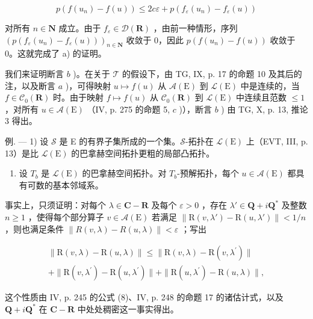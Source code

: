 \[
p (f (u _ {n}) - f (u)) \leqslant 2 c \varepsilon + p (f _ {\varepsilon} (u _ {n}) - f _ {\varepsilon} (u))
\]

对所有 \(n \in \mathbf{N}\) 成立。由于 \(f_{\varepsilon} \in \mathcal{D}(\mathbf{R})\) ，由前一种情形，序列 \((p(f_{\varepsilon}(u_n) - f_{\varepsilon}(u)))_{n \in \mathbf{N}}\) 收敛于 0，因此 \(p(f(u_n) - f(u))\) 收敛于 0。这就完成了 a) 的证明。

我们来证明断言 \(b\) )。在关于 \(\mathcal{T}\) 的假设下，由 TG, IX, p. 17 的命题 10 及其后的注，以及断言 \(a\) )，可得映射 \(u \mapsto f(u)\) 从 \(\mathcal{A}(\mathrm{E})\) 到 \(\mathcal{L}(\mathrm{E})\) 中是连续的，当 \(f \in \mathcal{C}_0(\mathbf{R})\) 时。由于映射 \(f \mapsto f(u)\) 从 \(\mathcal{C}_0(\mathbf{R})\) 到 \(\mathcal{L}(\mathrm{E})\) 中连续且范数 \(\leqslant 1\) ，对所有 \(u \in \mathcal{A}(\mathrm{E})\) （IV, p. 275 的命题 5, \(c\) )），断言 \(b\) ) 由 TG, X, p. 13, 推论 3 得出。

例. --- 1) 设 \(\mathscr{S}\) 是 E 的有界子集所成的一个集。\(\mathscr{S}\)-拓扑在 \(\mathcal{L}(\mathrm{E})\) 上（EVT, III, p. 13）是比 \(\mathcal{L}(\mathrm{E})\) 的巴拿赫空间拓扑更粗的局部凸拓扑。

\begin{enumerate}
\def\labelenumi{\arabic{enumi})}
\setcounter{enumi}{1}
\tightlist
\item
  设 \(T_{b}\) 是 \(\mathcal{L}(\mathrm{E})\) 的巴拿赫空间拓扑。对 \(T_{b}\)-预解拓扑，每个 \(u \in \mathcal{A}(\mathrm{E})\) 都具有可数的基本邻域系。
\end{enumerate}

事实上，只须证明：对每个 \(\lambda \in \mathbf{C} - \mathbf{R}\) 及每个 \(\varepsilon > 0\) ，存在 \(\lambda' \in \mathbf{Q} + i\mathbf{Q}^*\) 及整数 \(n \geqslant 1\) ，使得每个部分算子 \(v \in \mathcal{A}(\mathrm{E})\) 若满足 \(\| \mathrm{R}(v, \lambda') - \mathrm{R}(u, \lambda')\| < 1/n\) ，则也满足条件 \(\|R(v,\lambda)-R(u,\lambda)\|<\varepsilon\) ；写出

\[
\begin{array}{c} \| \mathrm{R} (v, \lambda) - \mathrm{R} (u, \lambda) \| \leqslant \| \mathrm{R} (v, \lambda) - \mathrm{R} (v, \lambda^ {\prime}) \| \\ + \| \mathrm{R} (v, \lambda^ {\prime}) - \mathrm{R} (u, \lambda^ {\prime}) \| + \| \mathrm{R} (u, \lambda^ {\prime}) - \mathrm{R} (u, \lambda) \|, \end{array}
\]

这个性质由 IV, p. 245 的公式 (8)、IV, p. 248 的命题 17 的诸估计式，以及 \(\mathbf{Q} + i\mathbf{Q}^*\) 在 \(\mathbf{C} - \mathbf{R}\) 中处处稠密这一事实得出。

